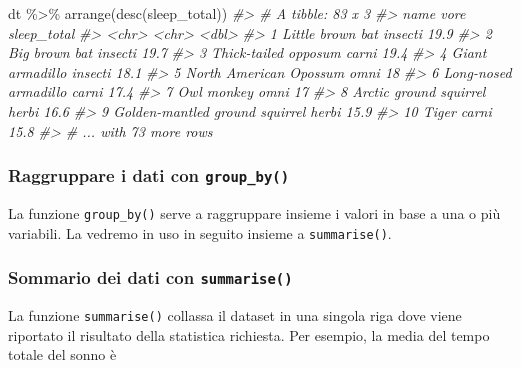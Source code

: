 \documentclass[
]{memoir}
\newenvironment{Shaded}{\begin{snugshade}}{\end{snugshade}}
\newcommand{\CommentTok}[1]{\textcolor[rgb]{0.56,0.35,0.01}{\textit{#1}}}
\newcommand{\FunctionTok}[1]{\textcolor[rgb]{0.00,0.00,0.00}{#1}}
\newcommand{\NormalTok}[1]{#1}
\newcommand{\SpecialCharTok}[1]{\textcolor[rgb]{0.00,0.00,0.00}{#1}}
\theoremstyle{definition}
\theoremstyle{definition}
\theoremstyle{definition}
\theoremstyle{definition}
\theoremstyle{remark}
\begin{document}
\begin{Shaded}
\begin{Highlighting}[]
\NormalTok{dt }\SpecialCharTok{\%\textgreater{}\%}
  \FunctionTok{arrange}\NormalTok{(}\FunctionTok{desc}\NormalTok{(sleep\_total))}
\CommentTok{\#\textgreater{} \# A tibble: 83 x 3}
\CommentTok{\#\textgreater{}    name                           vore    sleep\_total}
\CommentTok{\#\textgreater{}    \textless{}chr\textgreater{}                          \textless{}chr\textgreater{}         \textless{}dbl\textgreater{}}
\CommentTok{\#\textgreater{}  1 Little brown bat               insecti        19.9}
\CommentTok{\#\textgreater{}  2 Big brown bat                  insecti        19.7}
\CommentTok{\#\textgreater{}  3 Thick{-}tailed opposum           carni          19.4}
\CommentTok{\#\textgreater{}  4 Giant armadillo                insecti        18.1}
\CommentTok{\#\textgreater{}  5 North American Opossum         omni           18  }
\CommentTok{\#\textgreater{}  6 Long{-}nosed armadillo           carni          17.4}
\CommentTok{\#\textgreater{}  7 Owl monkey                     omni           17  }
\CommentTok{\#\textgreater{}  8 Arctic ground squirrel         herbi          16.6}
\CommentTok{\#\textgreater{}  9 Golden{-}mantled ground squirrel herbi          15.9}
\CommentTok{\#\textgreater{} 10 Tiger                          carni          15.8}
\CommentTok{\#\textgreater{} \# ... with 73 more rows}
\end{Highlighting}
\end{Shaded}

\hypertarget{raggruppare-i-dati-con-group_by}{%
\subsubsection{\texorpdfstring{Raggruppare i dati con \texttt{group\_by()}}{Raggruppare i dati con group\_by()}}\label{raggruppare-i-dati-con-group_by}}

La funzione \texttt{group\_by()} serve a raggruppare insieme i valori in base a
una o più variabili. La vedremo in uso in seguito insieme a
\texttt{summarise()}.

\hypertarget{sommario-dei-dati-con-summarise}{%
\subsubsection{\texorpdfstring{Sommario dei dati con \texttt{summarise()}}{Sommario dei dati con summarise()}}\label{sommario-dei-dati-con-summarise}}

La funzione \texttt{summarise()} collassa il dataset in una singola riga dove
viene riportato il risultato della statistica richiesta. Per esempio, la
media del tempo totale del sonno è
\end{document}
